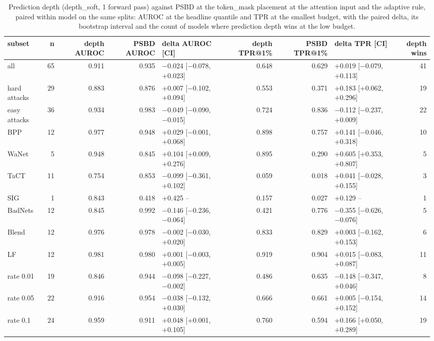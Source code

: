 \begin{table}[htbp]
\centering
\small
\caption{Prediction depth (depth\_soft, 1 forward pass) against PSBD at the token\_mask placement at the attention input and the adaptive rule, paired within model on the same splits: AUROC at the headline quantile and TPR at the smallest budget, with the paired delta, its bootstrap interval and the count of models where prediction depth wins at the low budget.}
\label{tab:prediction-depth}
\begin{adjustbox}{max width=\linewidth}
\begin{tabular}{lrrrlrrlr}
\toprule
subset & n & depth AUROC & PSBD AUROC & delta AUROC [CI] & depth TPR@1\% & PSBD TPR@1\% & delta TPR [CI] & depth wins \\
\midrule
all & 65 & 0.911 & 0.935 & $-$0.024 [$-$0.078, +0.023] & 0.648 & 0.629 & +0.019 [$-$0.079, +0.113] & 41 \\
hard attacks & 29 & 0.883 & 0.876 & +0.007 [$-$0.102, +0.094] & 0.553 & 0.371 & +0.183 [+0.062, +0.296] & 19 \\
easy attacks & 36 & 0.934 & 0.983 & $-$0.049 [$-$0.090, $-$0.015] & 0.724 & 0.836 & $-$0.112 [$-$0.237, +0.009] & 22 \\
BPP & 12 & 0.977 & 0.948 & +0.029 [$-$0.001, +0.068] & 0.898 & 0.757 & +0.141 [$-$0.046, +0.318] & 10 \\
WaNet & 5 & 0.948 & 0.845 & +0.104 [+0.009, +0.276] & 0.895 & 0.290 & +0.605 [+0.353, +0.807] & 5 \\
TaCT & 11 & 0.754 & 0.853 & $-$0.099 [$-$0.361, +0.102] & 0.059 & 0.018 & +0.041 [$-$0.028, +0.155] & 3 \\
SIG & 1 & 0.843 & 0.418 & +0.425 -- & 0.157 & 0.027 & +0.129 -- & 1 \\
BadNets & 12 & 0.845 & 0.992 & $-$0.146 [$-$0.236, $-$0.064] & 0.421 & 0.776 & $-$0.355 [$-$0.626, $-$0.076] & 5 \\
Blend & 12 & 0.976 & 0.978 & $-$0.002 [$-$0.030, +0.020] & 0.833 & 0.829 & +0.003 [$-$0.162, +0.153] & 6 \\
LF & 12 & 0.981 & 0.980 & +0.001 [$-$0.003, +0.005] & 0.919 & 0.904 & +0.015 [$-$0.083, +0.087] & 11 \\
rate 0.01 & 19 & 0.846 & 0.944 & $-$0.098 [$-$0.227, $-$0.002] & 0.486 & 0.635 & $-$0.148 [$-$0.347, +0.046] & 8 \\
rate 0.05 & 22 & 0.916 & 0.954 & $-$0.038 [$-$0.132, +0.030] & 0.666 & 0.661 & +0.005 [$-$0.154, +0.152] & 14 \\
rate 0.1 & 24 & 0.959 & 0.911 & +0.048 [+0.001, +0.105] & 0.760 & 0.594 & +0.166 [+0.050, +0.289] & 19 \\
\bottomrule
\end{tabular}
\end{adjustbox}
\end{table}
